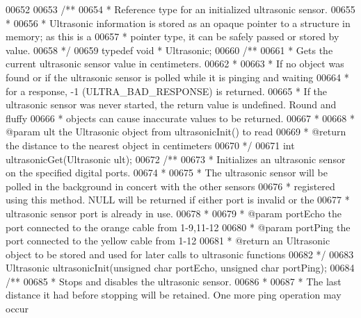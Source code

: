 \begin{DoxyCode}
00652 
00653 \textcolor{comment}{/**}
00654 \textcolor{comment}{ * Reference type for an initialized ultrasonic sensor.}
00655 \textcolor{comment}{ *}
00656 \textcolor{comment}{ * Ultrasonic information is stored as an opaque pointer to a structure in memory; as this is a}
00657 \textcolor{comment}{ * pointer type, it can be safely passed or stored by value.}
00658 \textcolor{comment}{ */}
00659 \textcolor{keyword}{typedef} \textcolor{keywordtype}{void} * Ultrasonic;
00660 \textcolor{comment}{/**}
00661 \textcolor{comment}{ * Gets the current ultrasonic sensor value in centimeters.}
00662 \textcolor{comment}{ *}
00663 \textcolor{comment}{ * If no object was found or if the ultrasonic sensor is polled while it is pinging and waiting}
00664 \textcolor{comment}{ * for a response, -1 (ULTRA\_BAD\_RESPONSE) is returned.}
00665 \textcolor{comment}{ * If the ultrasonic sensor was never started, the return value is undefined. Round and fluffy}
00666 \textcolor{comment}{ * objects can cause inaccurate values to be returned.}
00667 \textcolor{comment}{ *}
00668 \textcolor{comment}{ * @param ult the Ultrasonic object from ultrasonicInit() to read}
00669 \textcolor{comment}{ * @return the distance to the nearest object in centimeters}
00670 \textcolor{comment}{ */}
00671 \textcolor{keywordtype}{int} ultrasonicGet(Ultrasonic ult);
00672 \textcolor{comment}{/**}
00673 \textcolor{comment}{ * Initializes an ultrasonic sensor on the specified digital ports.}
00674 \textcolor{comment}{ *}
00675 \textcolor{comment}{ * The ultrasonic sensor will be polled in the background in concert with the other sensors}
00676 \textcolor{comment}{ * registered using this method. NULL will be returned if either port is invalid or the}
00677 \textcolor{comment}{ * ultrasonic sensor port is already in use.}
00678 \textcolor{comment}{ *}
00679 \textcolor{comment}{ * @param portEcho the port connected to the orange cable from 1-9,11-12}
00680 \textcolor{comment}{ * @param portPing the port connected to the yellow cable from 1-12}
00681 \textcolor{comment}{ * @return an Ultrasonic object to be stored and used for later calls to ultrasonic functions}
00682 \textcolor{comment}{ */}
00683 Ultrasonic ultrasonicInit(\textcolor{keywordtype}{unsigned} \textcolor{keywordtype}{char} portEcho, \textcolor{keywordtype}{unsigned} \textcolor{keywordtype}{char} portPing);
00684 \textcolor{comment}{/**}
00685 \textcolor{comment}{ * Stops and disables the ultrasonic sensor.}
00686 \textcolor{comment}{ *}
00687 \textcolor{comment}{ * The last distance it had before stopping will be retained. One more ping operation may occur}

\end{DoxyCode}
